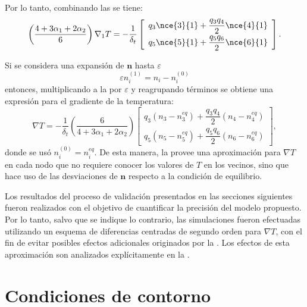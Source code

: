 Por lo tanto, combinando las  se tiene:
\begin{equation}
	\left( \dfrac{4+3\alpha_1+2\alpha_2}{6} \right) \nabla_1 T= -\dfrac{1}{\delta_t}
	\left[ 
 	\begin{array}{c} 
 		q_3 \nce{3}{1}  +  \dfrac{q_3q_4}{2}\nce{4}{1} \\[2mm]
 		q_5 \nce{5}{1}  +  \dfrac{q_5q_6}{2}\nce{6}{1}
 	\end{array} 
	\right].
	\label{eq:grad1_T}
\end{equation}

Si se considera una expansi\'on de $\bm{n}$ hasta $\varepsilon$
\begin{equation}
	\varepsilon n_i^{(1)} = n_i - n_i^{(0)}
\end{equation}
entonces, multiplicando a la  por $\varepsilon$ y reagrupando t\'erminos se obtiene una expresi\'on para el gradiente de la temperatura:
\begin{equation}
	\nabla T= -\dfrac{1}{\delta_t}\left( \dfrac{6}{4+3\alpha_1+2\alpha_2} \right)
	\left[ 
 	\begin{array}{c} 
 		q_3 (n_3 - n_3^{eq})  +  \dfrac{q_3q_4}{2} (n_4 - n_4^{eq}) \\[2mm]
 		q_5 (n_5 - n_5^{eq})  +  \dfrac{q_5q_6}{2} (n_6 - n_6^{eq})
 	\end{array} 
	\right],
	\label{eq:gradT_2d}
\end{equation}
donde se us\'o $n_i^{(0)} = n_i^{eq}$. De esta manera, la  provee una aproximaci\'on para $\nabla T$ en cada nodo que no requiere conocer los valores de $T$ en los vecinos, sino que hace uso de las desviaciones de $\bm{n}$ respecto a la condici\'on de equilibrio.

Los resultados del proceso de validaci\'on presentados en las secciones siguientes fueron realizados con el objetivo de cuantificar la precisi\'on del modelo propuesto. Por lo tanto, salvo que se indique lo contrario, las simulaciones fueron efectuadas utilizando un esquema de diferencias centradas de segundo orden para $\nabla T$, con el fin de evitar posibles efectos adicionales originados por la . Los efectos de esta aproximaci\'on son analizados expl\'icitamente en la .



\section{Condiciones de contorno}

